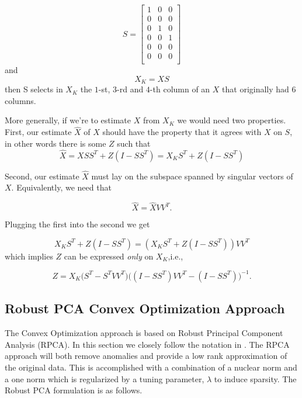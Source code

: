 \documentclass[conference]{IEEEtran}
\begin{document}
$$
S = 
\begin{bmatrix}
1 & 0 & 0 \\
0 & 0 & 0 \\
0 & 1 & 0 \\
0 & 0 & 1 \\
0 & 0 & 0 \\
0 & 0 & 0 \\
\end{bmatrix}
$$
\noindent
and
$$X_K = X S$$
\noindent
then S  selects in $X_K$ the $1$-st, $3$-rd and $4$-th column of an $X$ that originally had $6$ columns.


More generally, if we're to estimate $X$ from $X_K$ we would need two properties.
First, our estimate $\hat{X}$ of $X$ should have the property that it agrees with $X$ on $S$, in other words there is some $Z$ such that
$$
\hat{X} = X S S^T + Z (I-S S^T) = X_K S^T + Z (I-S S^T)
$$

Second, our estimate $\hat{X}$ must lay on the subspace spanned by singular vectors of $X$.  Equivalently, we need that

$$
\hat{X} = \hat{X} V V^T.
$$

Plugging the first into the second we get


$$
X_K S^T + Z (I-S S^T) = (X_K S^T + Z (I-S S^T)) V V^T 
$$
which implies $Z$ can be expressed \emph{only}  on $X_K$,i.e.,

$$Z= X_K \bigg(S^T - S^T V V^T\bigg) \bigg((I-S S^T)V V^T - (I-S S^T)\bigg)^{-1}.$$ 
%
%
%
%
%


\subsection{Robust PCA Convex Optimization Approach}
The Convex Optimization approach is based on Robust Principal Component Analysis (RPCA). In this section we closely follow the notation in \cite{Paffenroth2012a,Paffenroth2013b,paffenroth2018robust}. The RPCA approach will both remove anomalies and provide a low rank approximation of the original data. This is accomplished with a combination of a nuclear norm and a one norm which is regularized by a tuning parameter, $\lambda$ to induce sparsity. The Robust PCA formulation is as follows.
\end{document}
